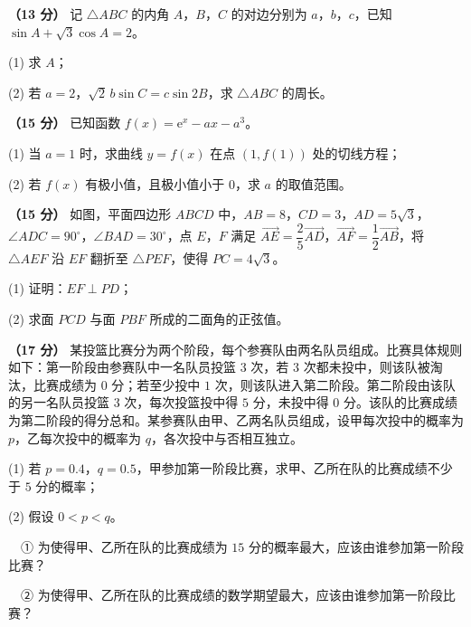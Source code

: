 \begin{question}
\textbf{（13 分）} 记 $\triangle ABC$ 的内角 $A$，$B$，$C$ 的对边分别为 $a$，$b$，$c$，已知 $\sin A+\sqrt3\cos A=2$。

  (1) 求 $A$；

  (2) 若 $a=2$，$\sqrt2\,b\sin C=c\sin2B$，求 $\triangle ABC$ 的周长。

\end{question}
\begin{question}
\textbf{（15 分）} 已知函数 $f(x)=\mathrm e^{x}-ax-a^{3}$。

  (1) 当 $a=1$ 时，求曲线 $y=f(x)$ 在点 $\left(1,f(1)\right)$ 处的切线方程；

  (2) 若 $f(x)$ 有极小值，且极小值小于 $0$，求 $a$ 的取值范围。

\Needspace{0.4\textheight}
\end{question}
\begin{question}
\textbf{（15 分）} 如图，平面四边形 $ABCD$ 中，$AB=8$，$CD=3$，$AD=5\sqrt3$，$\angle ADC=90^{\circ}$，$\angle BAD=30^{\circ}$，点 $E$，$F$ 满足 $\overrightarrow{AE}=\dfrac25\overrightarrow{AD}$，$\overrightarrow{AF}=\dfrac12\overrightarrow{AB}$，将 $\triangle AEF$ 沿 $EF$ 翻折至 $\triangle PEF$，使得 $PC=4\sqrt3$。
\nopagebreak[4]
\begin{center}\end{center}
\nopagebreak[4]
  (1) 证明：$EF\perp PD$；

  (2) 求面 $PCD$ 与面 $PBF$ 所成的二面角的正弦值。

\end{question}
\begin{question}
\textbf{（17 分）} 某投篮比赛分为两个阶段，每个参赛队由两名队员组成。比赛具体规则如下：第一阶段由参赛队中一名队员投篮 $3$ 次，若 $3$ 次都未投中，则该队被淘汰，比赛成绩为 $0$ 分；若至少投中 $1$ 次，则该队进入第二阶段。第二阶段由该队的另一名队员投篮 $3$ 次，每次投篮投中得 $5$ 分，未投中得 $0$ 分。该队的比赛成绩为第二阶段的得分总和。某参赛队由甲、乙两名队员组成，设甲每次投中的概率为 $p$，乙每次投中的概率为 $q$，各次投中与否相互独立。

  (1) 若 $p=0.4$，$q=0.5$，甲参加第一阶段比赛，求甲、乙所在队的比赛成绩不少于 $5$ 分的概率；

  (2) 假设 $0<p<q$。

  　① 为使得甲、乙所在队的比赛成绩为 $15$ 分的概率最大，应该由谁参加第一阶段比赛？

  　② 为使得甲、乙所在队的比赛成绩的数学期望最大，应该由谁参加第一阶段比赛？

\end{question}
